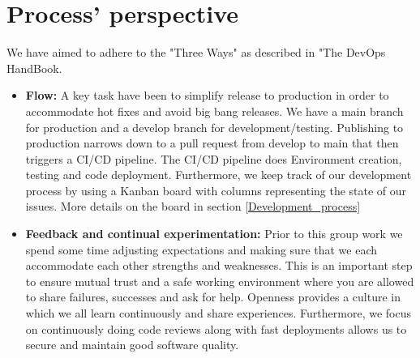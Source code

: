 \documentclass[10pt]{article}
\begin{document}
\section{Process' perspective}
We have aimed to adhere to the "Three Ways" as described in "The DevOps HandBook\cite{kim2021devops}. 
\begin{itemize}
    \item \textbf{Flow:} A key task have been to simplify release to production in order to accommodate hot fixes and avoid big bang releases. We have a main branch for production and a develop branch for development/testing. Publishing to production narrows down to a pull request from develop to main that then triggers a CI/CD pipeline. The CI/CD pipeline does Environment creation, testing and code deployment. Furthermore, we keep track of our development process by using a Kanban board with columns representing the state of our issues. More details on the board in section \ref{Development_process}
    \item\textbf{Feedback and continual experimentation: }Prior to this group work we spend some time adjusting expectations and making sure that we each accommodate each other strengths and weaknesses. This is an important step to ensure mutual trust and a safe working environment where you are allowed to share failures, successes and ask for help. Openness provides a culture in which we all learn continuously and share experiences. Furthermore, we focus on continuously doing code reviews along with fast deployments allows us to secure and maintain good software quality.
\end{itemize}
\\
\\


\end{document}
